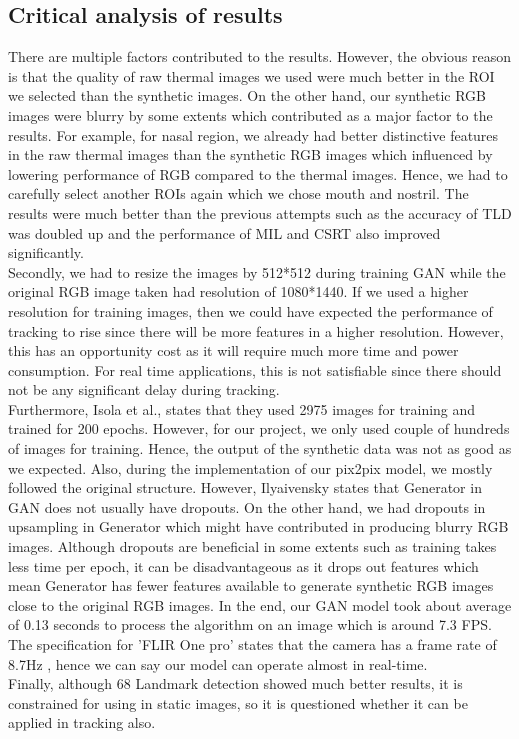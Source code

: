 \documentclass[conference]{IEEEtran}
\begin{document}
\subsection{Critical analysis of results}
There are multiple factors contributed to the results. However, the obvious reason is that the quality of raw thermal images we used were much better in the ROI we selected than the synthetic images. On the other hand, our synthetic RGB images were blurry by some extents which contributed as a major factor to the results. For example, for nasal region, we already had better distinctive features in the raw thermal images than the synthetic RGB images which influenced by lowering performance of RGB compared to the thermal images. Hence, we had to carefully select another ROIs again which we chose mouth and nostril. The results were much better than the previous attempts such as the accuracy of TLD was doubled up and the performance of MIL and CSRT also improved significantly.\\
Secondly, we had to resize the images by 512*512 during training GAN while the original RGB image taken had resolution of 1080*1440. If we used a higher resolution for training images, then we could have expected the performance of tracking to rise since there will be more features in a higher resolution. However, this has an opportunity cost as it will require much more time and power consumption. For real time applications, this is not satisfiable since there should not be any significant delay during tracking.\\
Furthermore, Isola et al., \cite{b1} states that they used 2975 images for training and trained for 200 epochs. However, for our project, we only used couple of hundreds of images for training. Hence, the output of the synthetic data was not as good as we expected. Also, during the implementation of our pix2pix model, we mostly followed the original structure. However, Ilyaivensky \cite{b13} states that Generator in GAN does not usually have dropouts. On the other hand, we had dropouts in upsampling in Generator which might have contributed in producing blurry RGB images. Although dropouts are beneficial in some extents such as training takes less time per epoch, it can be disadvantageous as it drops out features which mean Generator has fewer features available to generate synthetic RGB images close to the original RGB images. In the end, our GAN model took about average of 0.13 seconds to process the algorithm on an image which is around 7.3 FPS. The specification for ’FLIR One pro’ states that the camera has a frame rate of 8.7Hz \cite{b18}, hence we can say our model can operate almost in real-time. \\
Finally, although 68 Landmark detection showed much better results, it is constrained for using in static images, so it is questioned whether it can be applied in tracking also.
\end{document}
